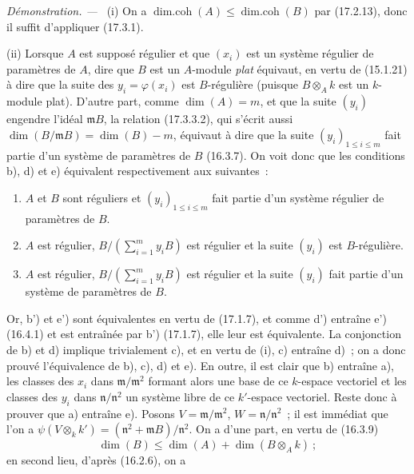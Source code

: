\documentclass[10pt,oneside]{book}
\newcommand{\oldpage}[2][]{%
  \setcounter{footnote}{0}%
  \marginpar{\scriptsize\textbf{#1}~|~#2}\ignorespaces}
\newenvironment{proof}{%
  \par\medskip\noindent\textit{Démonstration. ---\ }}{\par}
\begin{document}
\begin{proof}
\textnormal{(i)} On a
$\operatorname{dim.coh}(A)\leq\operatorname{dim.coh}(B)$ par (17.2.13), donc
il suffit d'appliquer (17.3.1).

\textnormal{(ii)} Lorsque $A$ est supposé régulier et que $(x_i)$ est un
système régulier de paramètres de $A$, dire que $B$ est un $A$-module
\emph{plat} équivaut, en vertu de (15.1.21) à dire que la suite des
$y_i=\varphi(x_i)$ est $B$-régulière (puisque $B\otimes_A k$ est un
$k$-module plat). D'autre part, comme $\dim(A)=m$, et que la suite $(y_i)$
engendre l'idéal $\mathfrak{m}B$, la relation (17.3.3.2), qui s'écrit aussi
$\dim(B/\mathfrak{m}B)=\dim(B)-m$, équivaut à dire que la suite
$(y_i)_{1\leq i\leq m}$ fait partie d'un système de paramètres de $B$
(16.3.7). On voit donc que les conditions b), d) et e) équivalent
respectivement aux suivantes~:
\begin{enumerate}
  \item[\rm b')] $A$ et $B$ sont réguliers et $(y_i)_{1\leq i\leq m}$ fait
  partie d'un système régulier de paramètres de $B$.
  \item[\rm d')] $A$ est régulier,
  $B/(\sum_{i=1}^m y_iB)$ est régulier et la suite $(y_i)$ est
  $B$-régulière.
  \item[\rm e')] $A$ est régulier,
  $B/(\sum_{i=1}^m y_iB)$ est régulier et la suite $(y_i)$ fait partie d'un
  système de paramètres de $B$.
\end{enumerate}
Or, b') et e') sont équivalentes en vertu de (17.1.7), et comme d') entraîne
e') (16.4.1) et est entraînée par b') (17.1.7), elle leur est équivalente. La
conjonction
\oldpage[0\textsubscript{IV-1}]{49}
de b) et d) implique trivialement c), et en vertu de (i), c) entraîne d)~; on
a donc prouvé l'équivalence de b), c), d) et e). En outre, il est clair que b)
entraîne a), les classes des $x_i$ dans
$\mathfrak{m}/\mathfrak{m}^2$ formant alors une base de ce $k$-espace
vectoriel et les classes des $y_i$ dans $\mathfrak{n}/\mathfrak{n}^2$ un
système libre de ce $k'$-espace vectoriel. Reste donc à prouver que a)
entraîne e). Posons $V=\mathfrak{m}/\mathfrak{m}^2$,
$W=\mathfrak{n}/\mathfrak{n}^2$~; il est immédiat que l'on a
$\psi(V\otimes_k k')=(\mathfrak{n}^2+\mathfrak{m}B)/\mathfrak{n}^2$. On a
d'une part, en vertu de (16.3.9)
\begin{equation}
\label{0.17.3.3.3-fr}
\tag{17.3.3.3}
  \dim(B)\leq\dim(A)+\dim(B\otimes_A k)~;
\end{equation}
en second lieu, d'après (16.2.6), on a
\begin{equation}

\end{equation}
\end{proof}
\end{document}
